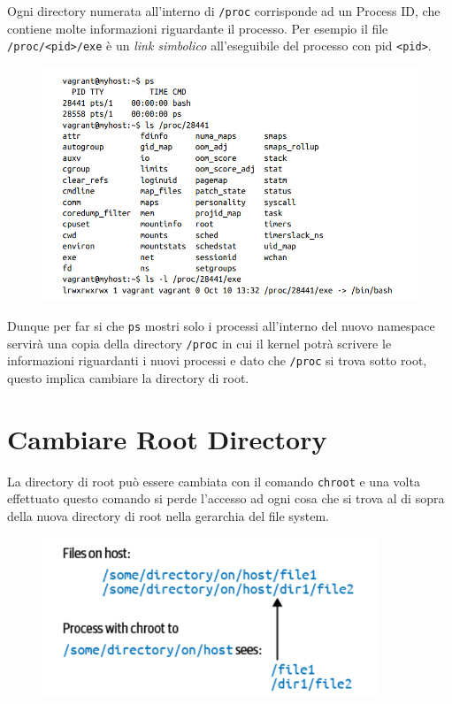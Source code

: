 Ogni directory numerata all'interno di \verb|/proc| corrisponde ad un Process ID,
che contiene molte informazioni riguardante il processo. Per esempio il file
\verb|/proc/<pid>/exe| è un \textit{link simbolico} all'eseguibile del processo
con pid \verb|<pid>|.

\begin{figure}[H]
    \centering
    \includegraphics[width=12cm, keepaspectratio]{capitoli/os_security/imgs/pid7.png}
\end{figure}

Dunque per far si che \verb|ps| mostri solo i processi all'interno del nuovo
namespace servirà una copia della directory \verb|/proc| in cui il kernel
potrà scrivere le informazioni riguardanti i nuovi processi e dato che
\verb|/proc| si trova sotto root, questo implica cambiare la directory di root.

\section{Cambiare Root Directory}

La directory di root può essere cambiata con il comando \verb|chroot| e
una volta effettuato questo comando si perde l'accesso ad ogni cosa che si trova
al di sopra della nuova directory di root nella gerarchia del file system.

\begin{figure}[H]
    \centering
    \includegraphics[width=10cm, keepaspectratio]{capitoli/os_security/imgs/root1.png}
\end{figure}

